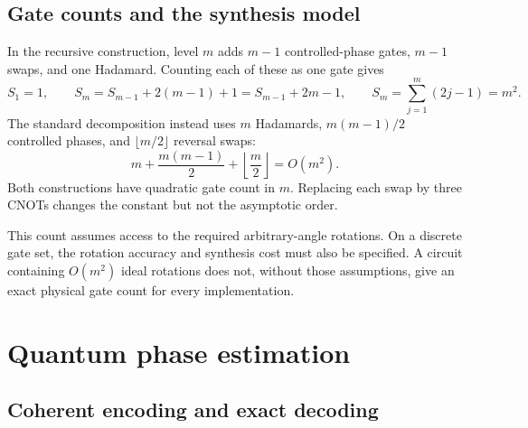 \documentclass[11pt,oneside,openany]{book}
\theoremstyle{definition}
\begin{document}
\subsection{Gate counts and the synthesis model}

In the recursive construction, level $m$ adds $m-1$ controlled-phase gates, $m-1$ swaps, and one Hadamard. Counting each of these as one gate gives
\begin{equation}
 S_1=1,\qquad S_m=S_{m-1}+2(m-1)+1=S_{m-1}+2m-1,
 \qquad S_m=\sum_{j=1}^m(2j-1)=m^2.
 \label{eq:phase:qftcost}
\end{equation}
The standard decomposition instead uses $m$ Hadamards, $m(m-1)/2$ controlled phases, and $\lfloor m/2\rfloor$ reversal swaps:
\begin{equation}
 m+\frac{m(m-1)}2+\left\lfloor\frac m2\right\rfloor=O(m^2).
\end{equation}
Both constructions have quadratic gate count in $m$. Replacing each swap by three CNOTs changes the constant but not the asymptotic order.

This count assumes access to the required arbitrary-angle rotations. On a discrete gate set, the rotation accuracy and synthesis cost must also be specified. A circuit containing $O(m^2)$ ideal rotations does not, without those assumptions, give an exact physical gate count for every implementation.

\section{Quantum phase estimation}

\subsection{Coherent encoding and exact decoding}
\end{document}
